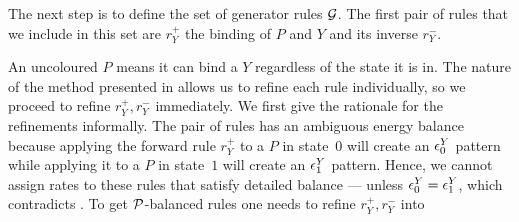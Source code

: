 The next step is to define the set of generator rules $\mathcal{G}$.
The first pair of rules that we include in this set
are $r^+_Y$ the binding of $P$ and $Y$ and its inverse $r^-_Y$.
\begin{center}
\end{center}
An uncoloured $P$ means
it can bind a $Y$ regardless of the state it is in.
The nature of the method presented in 
allows us to refine each rule individually,
so we proceed to refine $r^+_Y,r^-_Y$ immediately.
We first give the rationale for the refinements informally.
The pair of rules has an ambiguous energy balance %
because applying the forward rule $r^+_Y$ to a $P$ in state~$0$
will create an $\epsilon^Y_0$ pattern
while applying it to a $P$ in state~$1$
will create an $\epsilon^Y_1$ pattern.
Hence, we cannot assign %
rates to these rules that satisfy detailed balance ---
unless $\epsilon^Y_0 = \epsilon^Y_1$, which contradicts .
To get $\mathcal{P}$-balanced rules one needs to refine $r^+_Y,r^-_Y$ into
